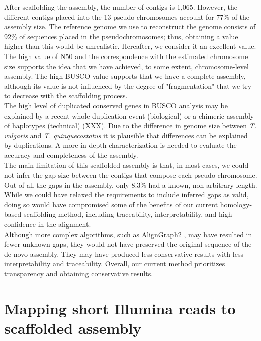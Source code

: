 After scaffolding the assembly, the number of contigs is 1,065. However, the different contigs placed into the 13 pseudo-chromosomes account for  77\% of the assembly size. The reference genome we use to reconstruct the genome consists of 92\% of sequences placed in the pseudochromosomes; thus, obtaining a value higher than this would be unrealistic. Hereafter, we consider it an excellent value. \\

The high value of N50 and the correspondence with the estimated chromosome size supports the idea that we have achieved, to some extent, chromosome-level assembly. The high BUSCO value supports that we have a complete assembly, although its value is not influenced by the degree of "fragmentation" that we try to decrease with the scaffolding process. \\

The high level of duplicated conserved genes in BUSCO analysis may be explained by a recent whole duplication event (biological) or a chimeric assembly of haplotypes (technical) (XXX). Due to the difference in genome size between \textit{T. vulgaris} and \textit{T. quinquecostatus} it is plausible that differences can be explained by duplications. A more in-depth characterization is needed to evaluate the accuracy and completeness of the assembly.  \\

The main limitation of this scaffolded assembly is that, in most cases, we could not infer the gap size between the contigs that compose each pseudo-chromosome. Out of all the gaps in the assembly, only 8.3\% had a known, non-arbitrary length. While we could have relaxed the requirements to include inferred gaps as valid, doing so would have compromised some of the benefits of our current homology-based scaffolding method, including traceability, interpretability, and high confidence in the alignment.\\

Although more complex algorithms, such as AlignGraph2 \cite{huangAlignGraph2SimilarGenomeassisted2021}, may have resulted in fewer unknown gaps, they would not have preserved the original sequence of the de novo assembly. They may have produced less conservative results with less interpretability and traceability. Overall, our current method prioritizes transparency and obtaining conservative results.\\

\section*{Mapping short Illumina reads to scaffolded assembly}

